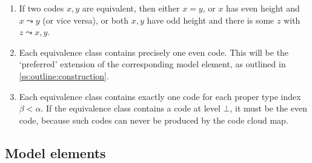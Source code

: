 \begin{remarks}
    \begin{enumerate}
        \item If two codes \( x, y \) are equivalent, then either \( x = y \), or \( x \) has even height and \( x \rightcurvedarrow y \) (or vice versa), or both \( x, y \) have odd height and there is some \( z \) with \( z \rightcurvedarrow x, y \).
        \item Each equivalence class contains precisely one even code.
        This will be the `preferred' extension of the corresponding model element, as outlined in \cref{ss:outline:construction}.
        \item Each equivalence class contains exactly one code for each proper type index \( \beta < \alpha \).
        If the equivalence class contains a code at level \( \bot \), it must be the even code, because such codes can never be produced by the code cloud map.
    \end{enumerate}
\end{remarks}

\subsection{Model elements}
